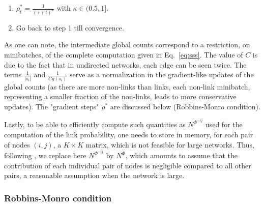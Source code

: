 \begin{enumerate}
{}
\item $\rho^*_t = \frac{1}{(\tau +t)^\kappa}$ with $\kappa \in (0.5, 1]$.
\item Go back to step 1 till convergence.
\end{enumerate}
%
As one can note, the intermediate global counts correspond to a restriction, on minibatches, of the complete computation given in Eq.~\ref{eq:sss}. The value of $C$ is due to the fact that in undirected networks, each edge can be seen twice. The terms $\frac{1}{|s_i|}$ and $\frac{1}{Cg(s_i)}$ serve as a normalization in the gradient-like updates of the global counts (as there are more non-links than links, each non-link minibatch, representing a smaller fraction of the non-links, leads to more conservative updates). The "gradient steps" $\rho^*$ are discussed below (Robbins-Monro condition).

Lastly, to be able to efficiently compute such quantities as $N^{\Phi^{-ij}}$ used for the computation of the link probability, one needs to store in memory, for each pair of nodes $(i,j)$, a $K \times K$ matrix, which is not feasible for large networks. Thus, following \cite{foulds2013stochastic}, we replace here $N^{\Phi^{-ij}}$ by $N^{\Phi}$, which amounts to assume that the contribution of each individual pair of nodes is negligible compared to all other pairs, a reasonable assumption when the network is large. %

\subsubsection{Robbins-Monro condition} 

\begin{table*}[t]
\tiny
\def\arraystretch{1} %
	
\label{table:corpus}
\end{table*}

